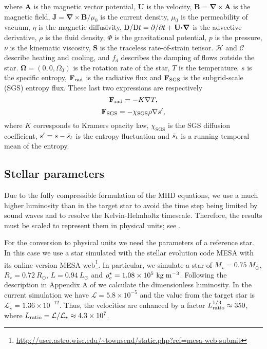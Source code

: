 \documentclass[baaa]{baaa}
\begin{document}
where $\textbf{A}$ is the magnetic vector potential, $\textbf{U}$ is the velocity, $\textbf{B}={\mathbf \nabla} \times \textbf{A}$ is the magnetic field, $\textbf{J}={\bm\nabla}\times\textbf{B}/\mu_{0}$ is the current density, $\mu_0$ is the permeability of vacuum, $\eta$ is the magnetic diffusivity, ${\rm D}/{\rm D}t=\partial/\partial t + \textbf{U}{\bm\cdot\bm\nabla}$ is the advective derivative, $\rho$ is the fluid density, $\Phi$ is the gravitational potential, $p$ is the pressure, $\nu$ is the kinematic viscosity, $\textbf{S}$ is the traceless rate-of-strain tensor. $\mathcal{H}$ and $\mathcal{C}$ describe heating and cooling, and $f_d$ describes the damping of flows outside the star. $\bm\Omega = (0,0,\Omega_0)$ is the rotation rate of the star, $T$ is the temperature, $s$ is the specific entropy, $\textbf{F}_{\rm rad}$ is the radiative flux and $\textbf{F}_{\rm SGS}$ is the subgrid-scale (SGS) entropy flux. These last two expressions are respectively
\begin{equation}
    \textbf{F}_{\textrm{rad}} = -K {\bf \nabla} T,
\end{equation}
\begin{equation}
   \textbf{F}_{\textrm{SGS}} = - \chi_{\textrm{SGS}} \rho {\bf \nabla} s',
\end{equation}
where $K$ corresponds to Kramers opacity law, $\chi_{\textrm{SGS}}$ is the SGS diffusion coefficient, $s' = s - \Bar{s}_t $ is the entropy fluctuation and $\Bar{s}_t$ is a running temporal mean of the entropy.

\subsection{Stellar parameters}

Due to the fully compressible formulation of the MHD equations, we use a much higher luminosity than in the target star to avoid the time step being limited by sound waves and to resolve the Kelvin-Helmholtz timescale. Therefore, the results must be scaled to represent them in physical units; see \cite{unifis}. 

For the conversion to physical units we need the parameters of a reference star. In this case we use a star simulated with the stellar evolution code MESA \citep{MESA} with its online version MESA web\footnote{\url{http://user.astro.wisc.edu/~townsend/static.php?ref=mesa-web-submit}}. In particular, we simulate a star of $M_{\star} = 0.75 ~  M_{\odot}$, $R_{\star} = 0.72~  R_{\odot}$, $L = 0.94~  L_{\odot}$ and $\rho_{c}^{\star} = 1.08\times 10^{5}~ \rm kg\; m^{-3}$. Following the description in Appendix A of \cite{unifis} we calculate the dimensionless luminosity. In the current simulation we have $\mathcal{L} = 5.8\times10^{-5}$ and the value from the target star is $\mathcal{L}_{\star} = 1.36\times 10^{-12}$. Thus, the velocities are enhanced by a factor $L_{\rm ratio}^{1/3} \approx 350$, where $L_{\rm ratio}=\mathcal{L}/\mathcal{L}_{\star} \approx 4.3\times 10^{7}$.
\end{document}
